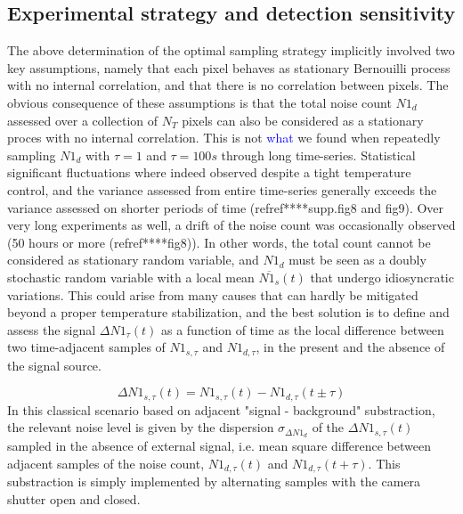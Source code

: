 \documentclass{article}
\begin{document}
\subsection*{Experimental strategy and detection sensitivity}

The above determination of the optimal sampling strategy implicitly involved two key assumptions, namely that each pixel behaves as stationary Bernouilli process with no internal correlation, and that there is no correlation between pixels.
The obvious consequence of these assumptions is that the total noise count $N1_d$ assessed over a collection of $N_T$ pixels can also be considered as a stationary proces with no internal correlation.
This is not \textcolor{blue}{what} we found when repeatedly sampling $N1_d$ with $\tau=1$ and $\tau=100s$ through long time-series.
Statistical significant fluctuations where indeed observed despite a tight temperature control, and the variance assessed from entire time-series generally exceeds the variance assessed on shorter periods of time (refref****supp.fig8 and fig9).
Over very long experiments as well, a drift of the noise count was occasionally observed  (50 hours or more (refref****fig8)). 
In other words, the total count cannot be considered as stationary random variable, and $N1_d$ must be seen as a doubly stochastic random variable with a local mean $\overline{N1_s}(t)$ that undergo idiosyncratic variations.
This could arise from many causes that can hardly be mitigated beyond a proper temperature stabilization, and the best solution is to define and assess the signal $\Delta N1_{\tau}(t)$ as a function of time as the local difference between two time-adjacent samples of $N1_{s,\tau}$ and $N1_{d,\tau}$, in the present and the absence of the signal source.

\begin{equation}
\Delta N1_{s,\tau}(t)   
= N1_{s,\tau}(t) - N1_{d,\tau}(t \pm \tau)
\end{equation}
In this classical scenario based on adjacent "signal - background" substraction, the relevant noise level is given by the dispersion $\sigma_{\Delta N1_d}$ of the $\Delta N1_{s,\tau}(t)$ sampled in the absence of external signal, i.e.
mean square difference between adjacent samples of the noise count, $N1_{d,\tau}(t)$ and $N1_{d,\tau}(t+\tau)$. This substraction is simply implemented by alternating samples with the camera shutter open and closed.
\end{document}
